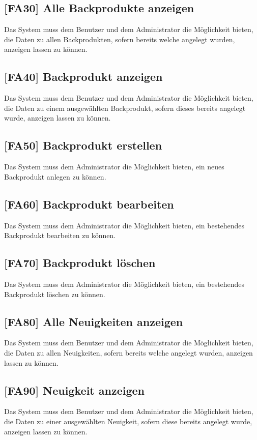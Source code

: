 \subsection{[FA30] Alle Backprodukte anzeigen} \label{fa30}
Das System muss dem Benutzer und dem Administrator die Möglichkeit bieten, die Daten zu allen Backprodukten, sofern bereits welche angelegt wurden, anzeigen lassen zu können.

\subsection{[FA40] Backprodukt anzeigen} \label{fa40}
Das System muss dem Benutzer und dem Administrator die Möglichkeit bieten, die Daten zu einem ausgewählten Backprodukt, sofern dieses bereits angelegt wurde, anzeigen lassen zu können.

\subsection{[FA50] Backprodukt erstellen} \label{fa50}
Das System muss dem Administrator die Möglichkeit bieten, ein neues Backprodukt anlegen zu können.

\subsection{[FA60] Backprodukt bearbeiten} \label{fa60}
Das System muss dem Administrator die Möglichkeit bieten, ein bestehendes Backprodukt bearbeiten zu können.

\subsection{[FA70] Backprodukt löschen} \label{fa70}
Das System muss dem Administrator die Möglichkeit bieten, ein bestehendes Backprodukt löschen zu können.

\subsection{[FA80] Alle Neuigkeiten anzeigen} \label{fa80}
Das System muss dem Benutzer und dem Administrator die Möglichkeit bieten, die Daten zu allen Neuigkeiten, sofern bereits welche angelegt wurden, anzeigen lassen zu können.

\subsection{[FA90] Neuigkeit anzeigen} \label{fa90}
Das System muss dem Benutzer und dem Administrator die Möglichkeit bieten, die Daten zu einer ausgewählten Neuigkeit, sofern diese bereits angelegt wurde, anzeigen lassen zu können.

